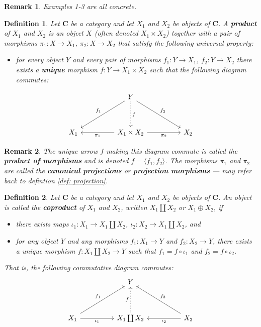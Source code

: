 \documentclass[12pt,reqno]{amsart}
\theoremstyle{plain}
\newtheorem{defi}{Definition}
\newtheorem{rem}{Remark}
\newcommand{\cat}{\mathbf{C}}
\begin{document}
\begin{rem} Examples 1-3 are all concrete. 
\end{rem} 
\begin{defi} Let $\cat$ be a category and let $X_1$ and $X_2$ be objects of $\cat$. A \textbf{product} of $X_1$ and $X_2$ is an object $X$ (often denoted $X_1 \times X_2$) together with a pair of morphisms $\pi_1 \colon X \to X_1$, $\pi_2 \colon X \to X_2$ that satisfy the following universal property:
\begin{itemize}
\item[\textup{$\bullet$}] for every object $Y$ and every pair of morphisms $f_1 \colon Y \to X_1$, $f_2 \colon Y \to X_2$ there exists a \textbf{unique} morphism $f \colon Y \to  X_1 \times X_2$ such that the following diagram commutes: 
\end{itemize}
\[
\begin{tikzcd}
  &  & Y \arrow[lldd, "f_1"'] \arrow[rrdd, "f_2"] \arrow[dd, "f", dotted] &  &   \\
  &  &                                                                &  &   \\
X_1 &  & X_1 \times X_2 \arrow[ll, "\pi_1"] \arrow[rr, "\pi_2"']                             &  & X_2
\end{tikzcd}
\]
\end{defi} 
\begin{rem} The unique arrow $f$ making this diagram commute is called the \textbf{product of morphisms} and is denoted $f = \langle f_1, f_2 \rangle$. The morphisms $\pi_1$ and $\pi_2$ are called the \textbf{canonical projections} or \textbf{projection morphisms} — may refer back to defintion \ref{def: projection}.
\end{rem} 
\begin{defi} Let $\cat$ be a category and let $X_1$ and $X_2$ be objects of $\cat$. An object is called the \textbf{coproduct} of $X_1$ and $X_2$, written $X_1 \coprod X_2$ or $X_1 \oplus X_2$, if
\begin{itemize}
\item[\textup{(i)}] there exists maps $\iota_1 \colon X_1 \to X_1 \coprod X_2$, $\iota_2 \colon X_2 \to X_1 \coprod X_2$, and
\item[\textup{(ii)}] for any object $Y$ and any morphisms $f_1 \colon X_1 \to Y$ and $f_2 \colon X_2 \to Y$, there exists a unique morphism $f \colon X_1 \coprod X_2 \to Y$ such that $f_1 = f \circ \iota_1$ and $f_2 = f \circ \iota_2$. 
\end{itemize}

That is, the following commutative diagram commutes: 
\[
\begin{tikzcd}
                                     &  & Y                         &  &                                      \\
                                     &  &                           &  &                                      \\
X_1 \arrow[rruu, "f_1"] \arrow[rr, "\iota_1"'] &  & X_1 \coprod X_2 \arrow[uu, "f", dotted] &  & X_2 \arrow[lluu, "f_2"'] \arrow[ll, "\iota_2"]
\end{tikzcd}
\]
\end{defi} 
\end{document}
